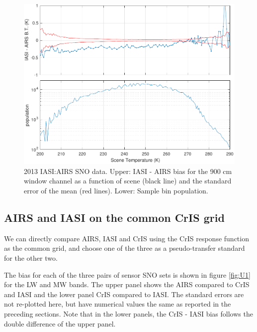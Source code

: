 \documentclass[twocolumn,10pt]{article}
\begin{document}
\begin{figure}[htb]
\centering
\includegraphics[width=\linewidth]{./figs/AI_jplSNO_bias_std_900wn_vScene.pdf}
\caption{\label{fig:orgparagraph20}
   2013 IASI:AIRS SNO data. Upper: IASI - AIRS bias for the 900 cm window channel as a function of scene (black line) and the standard error of the mean (red lines). Lower: Sample bin population.}
\label{fig:Z2}
\end{figure}



\subsection{AIRS and IASI on the common CrIS grid}
\label{sec:orgheadline11}
 We can directly compare AIRS, IASI and CrIS using the CrIS response function as the common grid, and choose one of the three as a pseudo-transfer standard for the other two.

The bias for each of the three pairs of sensor SNO sets is shown in figure \ref{fig:U1} for the LW and MW bands. The upper panel shows the AIRS compared to CrIS and IASI and the lower panel CrIS compared to IASI.  The standard errors are not re-plotted here, but have numerical values the same as reported in the preceding sections. Note that in the lower panels, the CrIS - IASI bias follows the double difference of the upper panel.  
\end{document}
